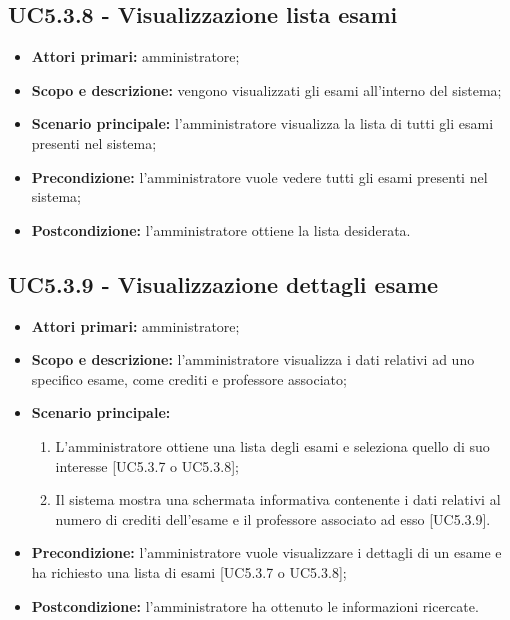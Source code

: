 \documentclass[AnalisiDeiRequisiti.tex]{subfiles}
\begin{document}
\subsection{UC5.3.8 - Visualizzazione lista esami}
\begin{itemize}
	\item \textbf{Attori primari:} amministratore;
	\item \textbf{Scopo e descrizione:} vengono visualizzati gli esami all'interno del sistema;
	\item \textbf{Scenario principale:} l'amministratore visualizza la lista di tutti gli esami presenti nel sistema;
	\item \textbf{Precondizione:} l'amministratore vuole vedere tutti gli esami presenti nel sistema; 
	\item \textbf{Postcondizione:} l'amministratore ottiene la lista desiderata.
\end{itemize}

\subsection{UC5.3.9 - Visualizzazione dettagli esame}
\begin{itemize}
	\item \textbf{Attori primari:} amministratore;
	\item \textbf{Scopo e descrizione:} l'amministratore visualizza i dati relativi ad uno specifico esame, come crediti e professore associato;
	\item \textbf{Scenario principale:}
	\begin{enumerate}
		\item L'amministratore ottiene una lista degli esami e seleziona quello di suo interesse [UC5.3.7 o UC5.3.8];
		\item Il sistema mostra una schermata informativa contenente i dati relativi al numero di crediti dell'esame e il professore associato ad esso [UC5.3.9].
	\end{enumerate}
	\item \textbf{Precondizione:} l'amministratore vuole visualizzare i dettagli di un esame e ha richiesto una lista di esami [UC5.3.7 o UC5.3.8]; 
	\item \textbf{Postcondizione:} l'amministratore ha ottenuto le informazioni ricercate.
\end{itemize}
\end{document}
